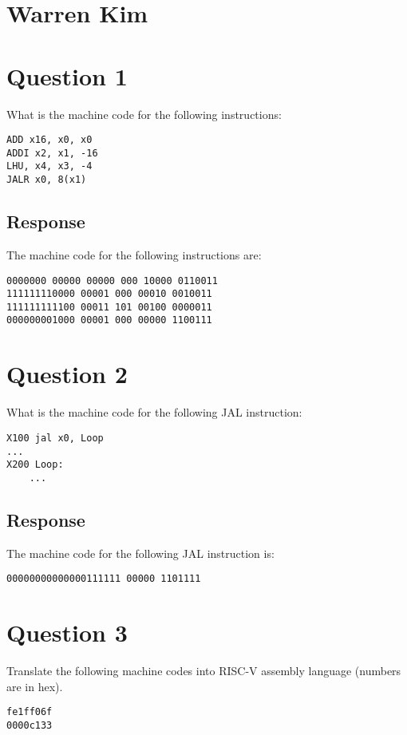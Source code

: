 \documentclass{article}
\begin{document}
\section*{Warren Kim}
\section*{Question 1}
What is the machine code for the following instructions:
\begin{verbatim}
ADD x16, x0, x0
ADDI x2, x1, -16
LHU, x4, x3, -4
JALR x0, 8(x1)
\end{verbatim}

\subsection*{Response}
The machine code for the following instructions are:

\begin{verbatim}
0000000 00000 00000 000 10000 0110011
111111110000 00001 000 00010 0010011
111111111100 00011 101 00100 0000011
000000001000 00001 000 00000 1100111
\end{verbatim}





\newpage
\section*{Question 2}
What is the machine code for the following JAL instruction:
\begin{verbatim}
X100 jal x0, Loop
...
X200 Loop:
    ...
\end{verbatim}

\subsection*{Response}
The machine code for the following JAL instruction is:
\begin{verbatim} 
00000000000000111111 00000 1101111
\end{verbatim}





\newpage
\section*{Question 3}
Translate the following machine codes into RISC-V assembly language (numbers are in hex).
\begin{verbatim}
fe1ff06f
0000c133
\end{verbatim}
\end{document}
